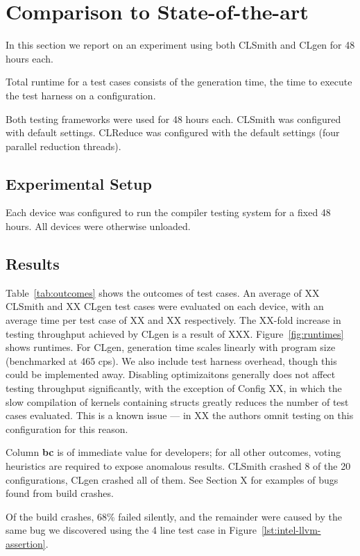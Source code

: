 \section{Comparison to State-of-the-art}\label{sec:vs_clsmith}

In this section we report on an experiment using both CLSmith and CLgen for 48 hours each.

Total runtime for a test cases consists of the generation time, the time to execute the test harness on a configuration.

Both testing frameworks were used for 48 hours each. CLSmith was configured with default settings. CLReduce was configured with the default settings (four parallel reduction threads).

\subsection{Experimental Setup}

Each device was configured to run the compiler testing system for a fixed 48 hours. All devices were otherwise unloaded.

\subsection{Results}

Table~\ref{tab:outcomes} shows the outcomes of test cases. An average of XX CLSmith and XX CLgen test cases were evaluated on each device, with an average time per test case of XX and XX respectively. The XX-fold increase in testing throughput achieved by CLgen is a result of XXX. Figure~\ref{fig:runtimes} shows runtimes. For CLgen, generation time scales linearly with program size (benchmarked at 465 cps). We also include test harness overhead, though this could be implemented away. Disabling optimizaitons generally does not affect testing throughput significantly, with the exception of Config XX, in which the slow compilation of kernels containing structs greatly reduces the number of test cases evaluated. This is a known issue --- in XX the authors omnit testing on this configuration for this reason.

Column \textbf{bc} is of immediate value for developers; for all other outcomes, voting heuristics are required to expose anomalous results. CLSmith crashed 8 of the 20 configurations, CLgen crashed all of them. See Section X for examples of bugs found from build crashes.

Of the build crashes, 68\% failed silently, and the remainder were caused by the same bug we discovered using the 4 line test case in Figure~\ref{lst:intel-llvm-assertion}.

